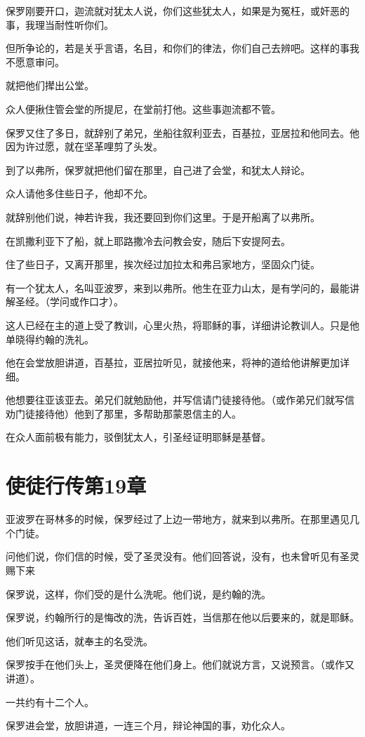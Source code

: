 \documentclass[12pt,oneside]{book}
\begin{document}
保罗刚要开口，迦流就对犹太人说，你们这些犹太人，如果是为冤枉，或奸恶的事，我理当耐性听你们。

但所争论的，若是关乎言语，名目，和你们的律法，你们自己去辨吧。这样的事我不愿意审问。

就把他们撵出公堂。

众人便揪住管会堂的所提尼，在堂前打他。这些事迦流都不管。

保罗又住了多日，就辞别了弟兄，坐船往叙利亚去，百基拉，亚居拉和他同去。他因为许过愿，就在坚革哩剪了头发。

到了以弗所，保罗就把他们留在那里，自己进了会堂，和犹太人辩论。

众人请他多住些日子，他却不允。

就辞别他们说，神若许我，我还要回到你们这里。于是开船离了以弗所。

在凯撒利亚下了船，就上耶路撒冷去问教会安，随后下安提阿去。

住了些日子，又离开那里，挨次经过加拉太和弗吕家地方，坚固众门徒。

有一个犹太人，名叫亚波罗，来到以弗所。他生在亚力山太，是有学问的，最能讲解圣经。（学问或作口才）。

这人已经在主的道上受了教训，心里火热，将耶稣的事，详细讲论教训人。只是他单晓得约翰的洗礼。

他在会堂放胆讲道，百基拉，亚居拉听见，就接他来，将神的道给他讲解更加详细。

他想要往亚该亚去。弟兄们就勉励他，并写信请门徒接待他。（或作弟兄们就写信劝门徒接待他）他到了那里，多帮助那蒙恩信主的人。

在众人面前极有能力，驳倒犹太人，引圣经证明耶稣是基督。

\chapter{使徒行传第19章}
亚波罗在哥林多的时候，保罗经过了上边一带地方，就来到以弗所。在那里遇见几个门徒。

问他们说，你们信的时候，受了圣灵没有。他们回答说，没有，也未曾听见有圣灵赐下来

保罗说，这样，你们受的是什么洗呢。他们说，是约翰的洗。

保罗说，约翰所行的是悔改的洗，告诉百姓，当信那在他以后要来的，就是耶稣。

他们听见这话，就奉主的名受洗。

保罗按手在他们头上，圣灵便降在他们身上。他们就说方言，又说预言。（或作又讲道）。

一共约有十二个人。

保罗进会堂，放胆讲道，一连三个月，辩论神国的事，劝化众人。
\end{document}
